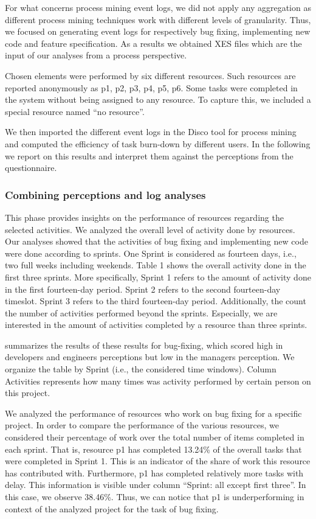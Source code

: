 For what concerns process mining event logs, we did not apply any aggregation as different process mining techniques work with different levels of granularity. Thus, we focused on generating event logs for respectively bug fixing, implementing new code and feature specification. As a results we obtained XES files which are the input of our analyses from a process perspective. 

Chosen elements were performed by six different resources. Such resources are reported anonymously as p1, p2, p3, p4, p5, p6. Some tasks were completed in the system without being assigned to any resource. To capture this, we included a special resource named “no resource”.  

We then imported the different event logs in the Disco tool for process mining and computed the efficiency of task burn-down by different users. In the following we report on this results and interpret them against the perceptions from the questionnaire.

\subsubsection{Combining perceptions and log analyses}

This phase provides insights on the performance of resources regarding the selected activities.  We analyzed the overall level of activity done by resources.  Our analyses showed that the activities of bug fixing and implementing new code were done according to sprints. One Sprint is considered as fourteen days, i.e., two full weeks including weekends. Table 1 shows the overall activity done in the first three sprints. More specifically, Sprint 1 refers to the amount of activity done in the first fourteen-day period. Sprint 2 refers to the second fourteen-day timeslot. Sprint 3 refers to the third fourteen-day period. Additionally, the count the number of activities performed beyond the sprints. Especially, we are interested in the amount of activities completed by a resource than three sprints.  

 summarizes the results of these results for bug-fixing, which scored high in developers and engineers perceptions but low in the managers perception. We organize the table by Sprint (i.e., the considered time windows). Column Activities represents how many times was activity performed by certain person on this project.



We analyzed the performance of resources who work on bug fixing for a specific project. In order to compare the performance of the various resources, we considered their percentage of work over the total number of items completed in each sprint. That is, resource p1 has completed 13.24\% of the overall tasks that were completed in Sprint 1. This is an indicator of the share of work this resource has contributed with. Furthermore, p1 has completed relatively more tasks with delay. This information is visible under column ``Sprint: all except first three''. In this case, we observe 38.46\%. Thus, we can notice that p1 is underperforming in context of the analyzed project for the task of bug fixing. 

